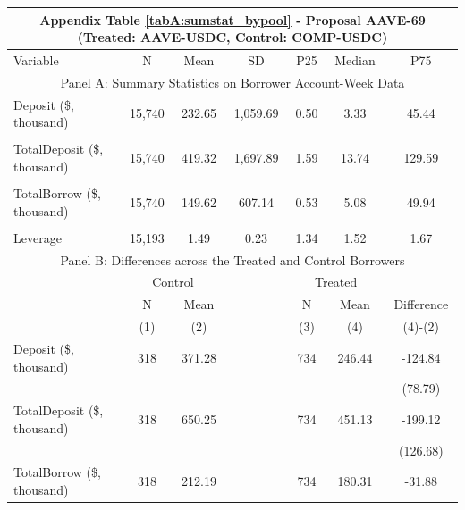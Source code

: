 \begin{table}[ht!]
\footnotesize 

\centering
\def\sym#1{\ifmmode^{#1}\else\(^{#1}\)\fi}


\begin{tabular*}{\linewidth}{@{\extracolsep{\fill}}lcccccc }
    \multicolumn{7}{c}{Appendix Table \ref{tabA:sumstat_bypool} - Proposal AAVE-69 (Treated: AAVE-USDC, Control: COMP-USDC)} \\
    \toprule
     Variable  &N & Mean & SD & P25 & Median & P75 \\
     \midrule
    \multicolumn{7}{c}{Panel A: Summary Statistics on Borrower Account-Week Data} \\
    \midrule
    Deposit (\$, thousand) & 15,740 & 232.65 & 1,059.69 & 0.50  & 3.33  & 45.44 \\
          &       &       &       &       &       &  \\
    TotalDeposit (\$, thousand) & 15,740 & 419.32 & 1,697.89 & 1.59  & 13.74 & 129.59 \\
          &       &       &       &       &       &  \\
    TotalBorrow (\$, thousand) & 15,740 & 149.62 & 607.14 & 0.53  & 5.08  & 49.94 \\
          &       &       &       &       &       &  \\
    Leverage & 15,193 & 1.49  & 0.23  & 1.34  & 1.52  & 1.67 \\
    \midrule
        \multicolumn{7}{c}{Panel B: Differences across the Treated and Control Borrowers} \\
\midrule
          & \multicolumn{2}{c}{Control} &       & \multicolumn{2}{c}{Treated} &  \\
\cmidrule{2-3}\cmidrule{5-6}          & N & Mean &       & N & Mean & Difference \\
\cmidrule{2-3}\cmidrule{5-6}          & (1) & (2) &       & (3) & (4) & (4)-(2) \\
\cmidrule{2-7}    Deposit (\$, thousand) & 318   & 371.28 &       & 734   & 246.44 & -124.84 \\
          &       &       &       &       &       & (78.79) \\
    TotalDeposit (\$, thousand) & 318   & 650.25 &       & 734   & 451.13 & -199.12 \\
          &       &       &       &       &       & (126.68) \\
    TotalBorrow (\$, thousand) & 318   & 212.19 &       & 734   & 180.31 & -31.88 \\

\end{tabular*}
\end{table}
